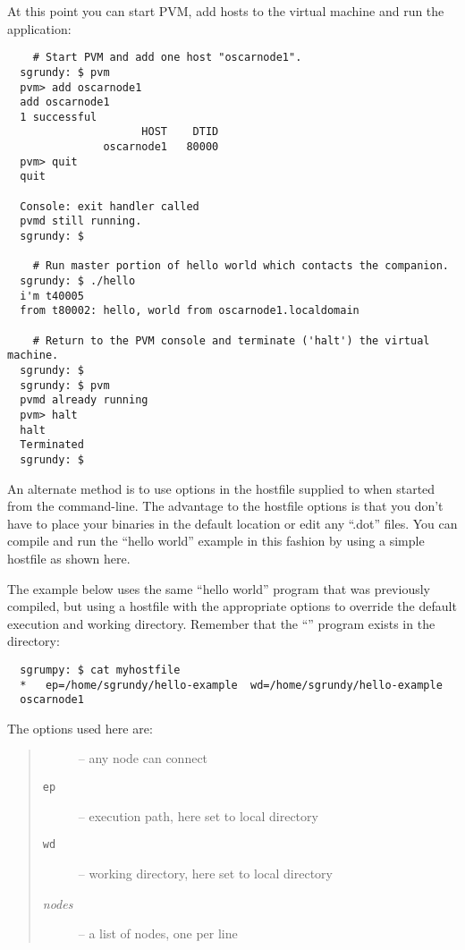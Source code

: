 \noindent At this point you can start PVM, add hosts to the virtual
machine and run the application:

\begin{small}
\begin{verbatim}
    # Start PVM and add one host "oscarnode1".
  sgrundy: $ pvm
  pvm> add oscarnode1
  add oscarnode1
  1 successful
                     HOST    DTID
               oscarnode1   80000
  pvm> quit
  quit

  Console: exit handler called
  pvmd still running.
  sgrundy: $

    # Run master portion of hello world which contacts the companion.
  sgrundy: $ ./hello
  i'm t40005
  from t80002: hello, world from oscarnode1.localdomain

    # Return to the PVM console and terminate ('halt') the virtual machine.
  sgrundy: $
  sgrundy: $ pvm
  pvmd already running
  pvm> halt
  halt
  Terminated
  sgrundy: $
\end{verbatim}
\end{small}

An alternate method is to use options in the hostfile supplied to
 when started from the command-line.  The advantage to the
hostfile options is that you don't have to place your binaries in the
default location or edit any ``.dot'' files.  You can compile and run
the ``hello world'' example in this fashion by using a simple hostfile
as shown here.  

The example below uses the same ``hello world'' program that was
previously compiled, but using a hostfile with the appropriate options
to override the default execution and working directory.  Remember
that the ``'' program exists in the
 directory:

\begin{small}
\begin{verbatim}
  sgrumpy: $ cat myhostfile
  *   ep=/home/sgrundy/hello-example  wd=/home/sgrundy/hello-example
  oscarnode1
\end{verbatim}
\end{small}

\noindent The options used here are: 
\begin{quote}
  \begin{description}
  \item[{\tt *}] -- any node can connect
  \item[{\tt ep}] -- execution path, here set to local directory
  \item[{\tt wd}] -- working directory, here set to local directory
  \item[\emph{nodes}] -- a list of nodes, one per line
  \end{description}
\end{quote}

